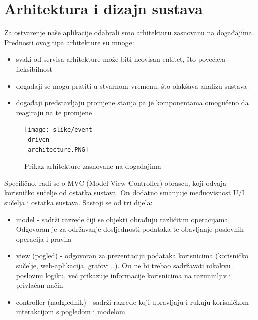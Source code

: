 \chapter{Arhitektura i dizajn sustava}
	
	Za ostvarenje naše aplikacije odabrali smo arhitekturu zasnovanu na događajima. Prednosti ovog tipa arhitekture su mnoge: 
	\begin{itemize}
		\item svaki od servisa arhitekture može biti neovisan entitet, što povećava fleksibilnost 
		\item događaji se mogu pratiti u stvarnom vremenu, što olakšava analizu sustava
		\item događaji predstavljaju promjene stanja pa je komponentama omogućeno da reagiraju na te promjene
	\end{itemize}
	
				\begin{figure}[H]
			\texttt{[image: slike/event\\\_driven\\\_architecture.PNG]} %
			\centering
			\caption{Prikaz arhitekture zasnovane na događajima}
			\label{event_driven_architecture}
		\end{figure}
		
	Specifično, radi se o MVC (Model-View-Controller) obrascu, koji odvaja korisničko sučelje od ostatka sustava. On dodatno smanjuje međuovisnost U/I sučelja i ostatka sustava. Sastoji se od tri dijela:
	
		\begin{itemize}
			\item model - sadrži razrede čiji se objekti obrađuju različitim operacijama. Odgovoran je za održavanje dosljednosti podataka te obavljanje poslovnih operacija i pravila
			\item view (pogled) - odgovoran za prezentaciju podataka korisnicima (korisničko sučelje, web-aplikacija, grafovi...). On ne bi trebao sadržavati nikakvu poslovnu logiku, već prikazuje informacije korisnicima na razunmljiv i privlačan način
			\item controller (nadglednik) - sadrži razrede koji upravljaju i rukuju korisničkom interakcijom s pogledom i modelom
		\end{itemize}
		
